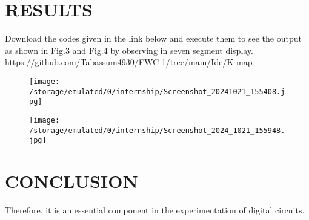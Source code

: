 \documentclass[conference]{IEEEtran}
\begin{document}
\section{RESULTS}
Download the codes given in the link below and execute them to see the output as shown in Fig.3 and Fig.4 by observing in seven segment display.
\\ https://github.com/Tabassum4930/FWC-1/tree/main/Ide/K-map
\begin{figure}[h] 
	\centering 
	\texttt{[image: /storage/emulated/0/internship/Screenshot\_20241021\_155408.jpg]}
	\caption{\label{fig:Gates}}    
\end{figure}

\begin{figure}[h] 
	\centering 
	\texttt{[image: /storage/emulated/0/internship/Screenshot\_2024\_1021\_155948.jpg]}
	\caption{\label{fig:Gates}}    
\end{figure}

\section{CONCLUSION}
Therefore, it is an essential component in the experimentation of digital circuits.
\end{document}
